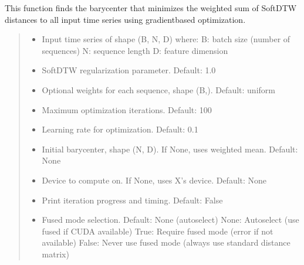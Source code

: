 \documentclass[letterpaper,10pt,english]{sphinxmanual}
\begin{document}
\begin{fulllineitems}
\sphinxAtStartPar
This function finds the barycenter that minimizes the weighted sum of SoftDTW
distances to all input time series using gradient\sphinxhyphen{}based optimization.
\begin{quote}\begin{description}
\begin{itemize}
\item {} 
\sphinxAtStartPar
{} \textendash{} Input time series of shape (B, N, D) where:
\sphinxhyphen{} B: batch size (number of sequences)
\sphinxhyphen{} N: sequence length
\sphinxhyphen{} D: feature dimension

\item {} 
\sphinxAtStartPar
{} \textendash{} SoftDTW regularization parameter. Default: 1.0

\item {} 
\sphinxAtStartPar
{} \textendash{} Optional weights for each sequence, shape (B,). Default: uniform

\item {} 
\sphinxAtStartPar
{} \textendash{} Maximum optimization iterations. Default: 100

\item {} 
\sphinxAtStartPar
{} \textendash{} Learning rate for optimization. Default: 0.1

\item {} 
\sphinxAtStartPar
{} \textendash{} Initial barycenter, shape (N, D). If None, uses weighted mean. Default: None

\item {} 
\sphinxAtStartPar
{} \textendash{} Device to compute on. If None, uses X’s device. Default: None

\item {} 
\sphinxAtStartPar
{} \textendash{} Print iteration progress and timing. Default: False

\item {} 
\sphinxAtStartPar
{} \textendash{} Fused mode selection. Default: None (auto\sphinxhyphen{}select)
\sphinxhyphen{} None: Auto\sphinxhyphen{}select (use fused if CUDA available)
\sphinxhyphen{} True: Require fused mode (error if not available)
\sphinxhyphen{} False: Never use fused mode (always use standard distance matrix)


\end{itemize}
\end{description}
\end{quote}
\end{fulllineitems}
\end{document}
